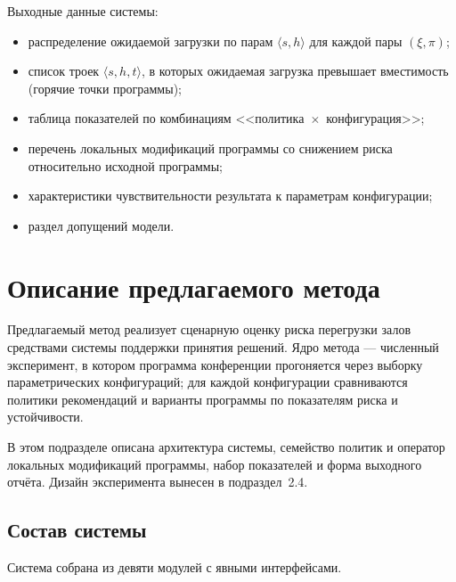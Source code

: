 Выходные данные системы:

\begin{itemize}
\item распределение ожидаемой загрузки по парам $\langle s, h \rangle$ для каждой пары $(\xi, \pi)$;
\item список троек $\langle s, h, t \rangle$, в которых ожидаемая загрузка превышает вместимость (горячие точки программы);
\item таблица показателей по комбинациям <<политика~$\times$~конфигурация>>;
\item перечень локальных модификаций программы со снижением риска относительно исходной программы;
\item характеристики чувствительности результата к параметрам конфигурации;
\item раздел допущений модели.
\end{itemize}


\section{Описание предлагаемого метода}

Предлагаемый метод реализует сценарную оценку риска перегрузки залов средствами системы поддержки принятия решений. Ядро метода --- численный эксперимент, в котором программа конференции прогоняется через выборку параметрических конфигураций; для каждой конфигурации сравниваются политики рекомендаций и варианты программы по показателям риска и устойчивости.

В этом подразделе описана архитектура системы, семейство политик и оператор локальных модификаций программы, набор показателей и форма выходного отчёта. Дизайн эксперимента вынесен в подраздел~2.4.


\subsection{Состав системы}

Система собрана из девяти модулей с явными интерфейсами.


